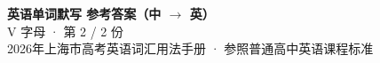 \documentclass[10pt,a4paper]{article}
\begin{document}
\pagestyle{plain}

\begin{center}
{\LARGE\bfseries 英语单词默写 \quad 参考答案（中 $\to$ 英）}\\[0.22em]
{\large V 字母 · 第 2 / 2 份}\\[0.18em]
{\small 2026年上海市高考英语词汇用法手册 · 参照普通高中英语课程标准}
\end{center}

\vspace{0.2em}
\noindent{\color{rulegray}\rule{\textwidth}{0.8pt}}

\vspace{0.35em}

\vspace{0.25em}
\renewcommand{\arraystretch}{1.32}
\end{document}
